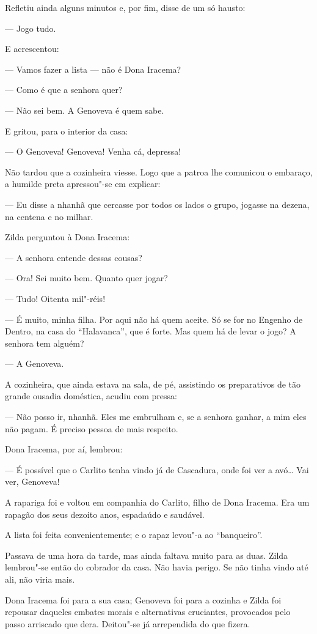 Refletiu ainda alguns minutos e, por fim, disse de um só hausto:

--- Jogo tudo.

E acrescentou:

--- Vamos fazer a lista --- não é Dona Iracema?

--- Como é que a senhora quer?

--- Não sei bem. A Genoveva é quem sabe.

E gritou, para o interior da casa:

--- O Genoveva! Genoveva! Venha cá, depressa!

Não tardou que a cozinheira viesse. Logo que a patroa lhe comunicou o
embaraço, a humilde preta apressou"-se em explicar:

--- Eu disse a nhanhã que cercasse por todos os lados o grupo, jogasse na
dezena, na centena e no milhar.

Zilda perguntou à Dona Iracema:

--- A senhora entende dessas cousas?

--- Ora! Sei muito bem. Quanto quer jogar?

--- Tudo! Oitenta mil"-réis!

--- É muito, minha filha. Por aqui não há quem aceite. Só se for no
Engenho de Dentro, na casa do ``Halavanca'', que é forte. Mas quem há de
levar o jogo? A senhora tem alguém?

--- A Genoveva.

A cozinheira, que ainda estava na sala, de pé, assistindo os
preparativos de tão grande ousadia doméstica, acudiu com pressa:

--- Não posso ir, nhanhã. Eles me embrulham e, se a senhora ganhar, a mim
eles não pagam. É preciso pessoa de mais respeito.

Dona Iracema, por aí, lembrou:

--- É possível que o Carlito tenha vindo já de Cascadura, onde foi ver a
avó\ldots{} Vai ver, Genoveva!

A rapariga foi e voltou em companhia do Carlito, filho de Dona Iracema.
Era um rapagão dos seus dezoito anos, espadaúdo e saudável.

A lista foi feita convenientemente; e o rapaz levou"-a ao ``banqueiro''.

Passava de uma hora da tarde, mas ainda faltava muito para as duas.
Zilda lembrou"-se então do cobrador da casa. Não havia perigo. Se não
tinha vindo até ali, não viria mais.

Dona Iracema foi para a sua casa; Genoveva foi para a cozinha e Zilda
foi repousar daqueles embates morais e alternativas cruciantes,
provocados pelo passo arriscado que dera. Deitou"-se já arrependida do
que fizera.

